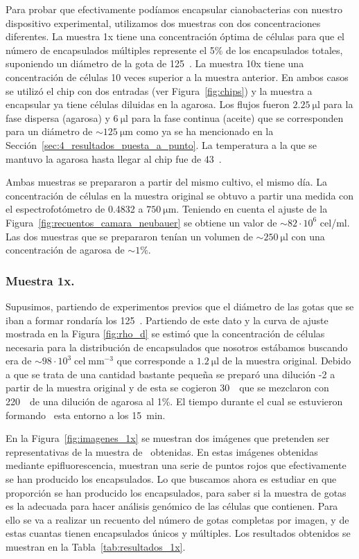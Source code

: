 Para probar que efectivamente podíamos encapsular cianobacterias con nuestro dispositivo experimental, utilizamos dos muestras con dos concentraciones diferentes. La muestra 1x tiene una concentración óptima de células para que el número de encapsulados múltiples represente el 5\% de los encapsulados totales, suponiendo un diámetro de la gota de 125~\micrometro. La muestra 10x tiene una concentración de células 10 veces superior a la muestra anterior. En ambos casos se utilizó el chip con dos entradas (ver Figura~\ref{fig:chips}) y la muestra a encapsular ya tiene células diluidas en la agarosa. Los flujos fueron $2.25~\mathrm{\mu l}$ para la fase dispersa (agarosa) y $6~\mathrm{\mu l}$ para la fase continua (aceite) que se corresponden para un diámetro de $\sim125~\mathrm{\mu m}$ como ya se ha mencionado en la Sección~\ref{sec:4_resultados_puesta_a_punto}. La temperatura a la que se mantuvo la agarosa hasta llegar al chip fue de 43~\celsius.

Ambas muestras se prepararon a partir del mismo cultivo, el mismo día. La concentración de células en la muestra original se obtuvo a partir una medida con el espectrofotómetro de 0.4832 a $750~\mathrm{\mu m}$. Teniendo en cuenta el ajuste de la Figura~\ref{fig:recuentos_camara_neubauer} se obtiene un valor de $\sim 82\cdot{10}^{6}$ cel/ml. Las dos muestras que se prepararon tenían un volumen de $\sim250~\mathrm{\mu l}$ con una concentración de agarosa de $\sim 1 \%$.

\subsubsection{Muestra 1x.}\label{muestra1x}

Supusimos, partiendo de experimentos previos que el diámetro de las gotas que se iban a formar rondaría los 125~\micrometro. Partiendo de este dato y la curva de ajuste mostrada en la Figura \ref{fig:rho_d} se estimó que la concentración de células necesaria para la distribución de encapsulados que nosotros estábamos buscando era de $\sim98\cdot{10}^{3}\;\mathrm{cel\;mm^{-3}}$ que corresponde a $1.2~\mathrm{\mu l}$ de la muestra original. Debido a que se trata de una cantidad bastante pequeña se preparó una dilución -2 a partir de la muestra original y de esta se cogieron 30~\microlitro\ que se mezclaron con 220~\microlitro\ de una dilución de agarosa al 1\%. El tiempo durante el cual se estuvieron formando \gotas\ esta entorno a los 15~min.

En la Figura~\ref{fig:imagenes_1x} se muestran dos imágenes que pretenden ser representativas de la muestra de \gotas\ obtenidas. En estas imágenes obtenidas mediante epifluorescencia, muestran una serie de puntos rojos que efectivamente se han producido los encapsulados. Lo que buscamos ahora es estudiar en que proporción se han producido los encapsulados, para saber si la muestra de gotas es la adecuada para hacer análisis genómico de las células que contienen. Para ello se va a realizar un recuento del número de gotas completas por imagen, y de estas cuantas tienen encapsulados únicos y múltiples. Los resultados obtenidos se muestran en la Tabla~\ref{tab:resultados_1x}.

